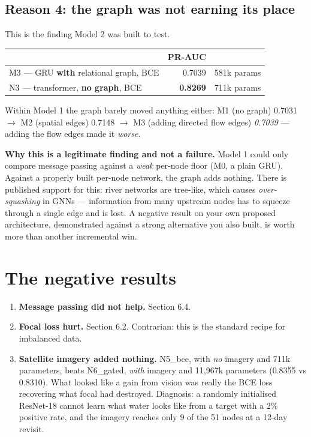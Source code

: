 \documentclass[11pt,a4paper]{article}
\newcommand{\good}[1]{\textcolor{green!45!black}{\textbf{#1}}}
\begin{document}
\subsection{Reason 4: the graph was not earning its place}

This is the finding Model 2 was built to test.

\begin{center}
\small
\begin{tabular}{@{}lrl@{}}
\toprule
& \textbf{PR-AUC} & \\
\midrule
M3 --- GRU \textbf{with} relational graph, BCE & 0.7039 & 581k params \\
N3 --- transformer, \textbf{no graph}, BCE & \good{0.8269} & 711k params \\
\bottomrule
\end{tabular}
\end{center}

\noindent
Within Model 1 the graph barely moved anything either: M1 (no graph) 0.7031
$\to$ M2 (spatial edges) 0.7148 $\to$ M3 (adding directed flow edges)
\emph{0.7039} --- adding the flow edges made it \emph{worse}.

\textbf{Why this is a legitimate finding and not a failure.} Model 1 could only
compare message passing against a \emph{weak} per-node floor (M0, a plain GRU).
Against a properly built per-node network, the graph adds nothing. There is
published support for this: river networks are tree-like, which causes
\emph{over-squashing} in GNNs --- information from many upstream nodes has to
squeeze through a single edge and is lost. A negative result on your own proposed
architecture, demonstrated against a strong alternative you also built, is worth
more than another incremental win.

\section{The negative results}
\label{sec:negative}

\begin{enumerate}[leftmargin=*]
\item \textbf{Message passing did not help.} Section 6.4.

\item \textbf{Focal loss hurt.} Section 6.2. Contrarian: this is the standard
recipe for imbalanced data.

\item \textbf{Satellite imagery added nothing.} N5\_bce, with \emph{no} imagery
and 711k parameters, beats N6\_gated, \emph{with} imagery and 11,967k
parameters (0.8355 vs 0.8310). What looked like a gain from vision was really
the BCE loss recovering what focal had destroyed. Diagnosis: a randomly
initialised ResNet-18 cannot learn what water looks like from a target with a
2\% positive rate, and the imagery reaches only 9 of the 51 nodes at a 12-day
revisit.
\end{enumerate}
\end{document}
